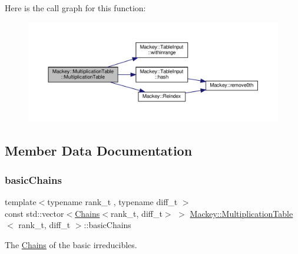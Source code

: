 Here is the call graph for this function\+:\nopagebreak
\begin{figure}[H]
\begin{center}
\leavevmode
\includegraphics[width=350pt]{classMackey_1_1MultiplicationTable_a3a7fcf71b8235a641b3e716064a3e384_cgraph}
\end{center}
\end{figure}


\subsection{Member Data Documentation}
\mbox{\label{classMackey_1_1MultiplicationTable_a2072078bd506c1b8f8aa80044af159ec}} 
\subsubsection{\texorpdfstring{basic\+Chains}{basicChains}}
{\footnotesize\ttfamily template$<$typename rank\+\_\+t , typename diff\+\_\+t $>$ \\
const std\+::vector$<$\hyperlink{classMackey_1_1Chains}{Chains}$<$rank\+\_\+t, diff\+\_\+t$>$ $>$ \hyperlink{classMackey_1_1MultiplicationTable}{Mackey\+::\+Multiplication\+Table}$<$ rank\+\_\+t, diff\+\_\+t $>$\+::basic\+Chains\hspace{0.3cm}{\ttfamily [protected]}}



The \hyperlink{classMackey_1_1Chains}{Chains} of the basic irreducibles. 

\mbox{\label{classMackey_1_1MultiplicationTable_ae24bff3ca169d3f9584f6bf7dcb390b1}} 
